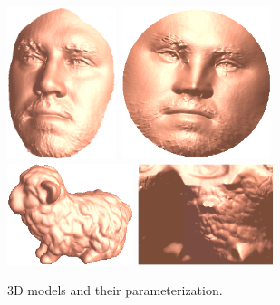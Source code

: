 {{\begin{figure}
\begin{center}
\includegraphics[height=1.75in]{figs/sweepcircle/dale_3d.png}
\includegraphics[height=1.75in]{figs/sweepcircle/dale_uv.png}\\
\includegraphics[width=1.45in]{figs/sweepcircle/sheep_3d.png}
\includegraphics[width=1.55in]{figs/sweepcircle/sheep_uv.png}\\
\end{center}
\caption{3D models and their parameterization.} \label{fig:3d}
\end{figure}

}}
